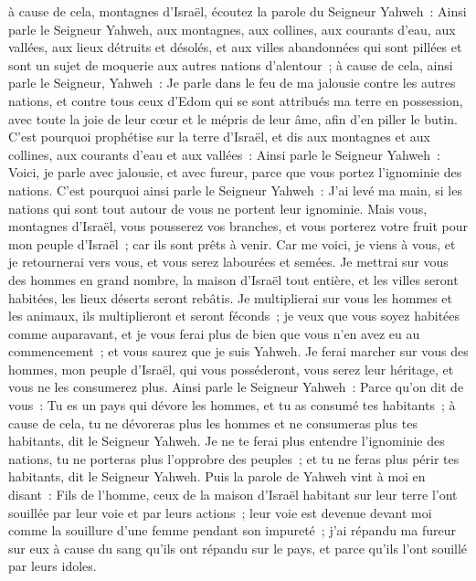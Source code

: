 \begin{multicols}{2}
à cause de cela, montagnes d'Israël, écoutez la parole du Seigneur Yahweh~: Ainsi parle le Seigneur Yahweh, aux montagnes, aux collines, aux courants d'eau, aux vallées, aux lieux détruits et désolés, et aux villes abandonnées qui sont pillées et sont un sujet de moquerie aux autres nations d'alentour~;
à cause de cela, ainsi parle le Seigneur, Yahweh~: Je parle dans le feu de ma jalousie contre les autres nations, et contre tous ceux d'Edom qui se sont attribués ma terre en possession, avec toute la joie de leur cœur et le mépris de leur âme, afin d'en piller le butin.
C'est pourquoi prophétise sur la terre d'Israël, et dis aux montagnes et aux collines, aux courants d'eau et aux vallées~: Ainsi parle le Seigneur Yahweh~: Voici, je parle avec jalousie, et avec fureur, parce que vous portez l'ignominie des nations.
C'est pourquoi ainsi parle le Seigneur Yahweh~: J'ai levé ma main, si les nations qui sont tout autour de vous ne portent leur ignominie.
Mais vous, montagnes d'Israël, vous pousserez vos branches, et vous porterez votre fruit pour mon peuple d'Israël~; car ils sont prêts à venir.
Car me voici, je viens à vous, et je retournerai vers vous, et vous serez labourées et semées.
Je mettrai sur vous des hommes en grand nombre, la maison d'Israël tout entière, et les villes seront habitées, les lieux déserts seront rebâtis.
Je multiplierai sur vous les hommes et les animaux, ils multiplieront et seront féconds~; je veux que vous soyez habitées comme auparavant, et je vous ferai plus de bien que vous n'en avez eu au commencement~; et vous saurez que je suis Yahweh.
Je ferai marcher sur vous des hommes, mon peuple d'Israël, qui vous posséderont, vous serez leur héritage, et vous ne les consumerez plus.
Ainsi parle le Seigneur Yahweh~: Parce qu'on dit de vous~: Tu es un pays qui dévore les hommes, et tu as consumé tes habitants~;
à cause de cela, tu ne dévoreras plus les hommes et ne consumeras plus tes habitants, dit le Seigneur Yahweh.
Je ne te ferai plus entendre l'ignominie des nations, tu ne porteras plus l'opprobre des peuples~; et tu ne feras plus périr tes habitants, dit le Seigneur Yahweh.
Puis la parole de Yahweh vint à moi en disant~:
Fils de l'homme, ceux de la maison d'Israël habitant sur leur terre l'ont souillée par leur voie et par leurs actions~; leur voie est devenue devant moi comme la souillure d'une femme pendant son impureté~;
j'ai répandu ma fureur sur eux à cause du sang qu'ils ont répandu sur le pays, et parce qu'ils l'ont souillé par leurs idoles.

\end{multicols}
